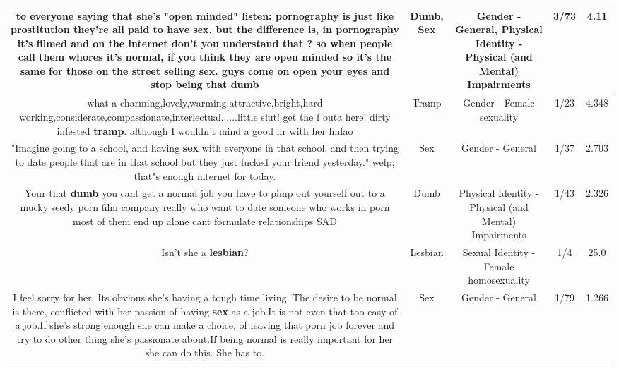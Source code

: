 \documentclass[11pt]{article}
\newlength\mylength
\begin{document}
\begin{center}
\begin{longtable}{|C{.65\mylength}|C{.30\mylength}|C{.12\mylength}|C{.12\mylength}|C{.12\mylength}|}
  \small to everyone saying that she's "open minded" listen: pornography is just like prostitution they're all paid to have \textbf{sex}, but the difference is, in pornography it's filmed and on the internet don't you understand that ? so when people call them whores it's normal, if you think they are open minded so it's the same for those on the street selling \textbf{sex}. guys come on open your eyes and stop being that dumb\normalsize   & Dumb, Sex & Gender - General, Physical Identity - Physical (and Mental) Impairments & 3/73 & 4.11 \\  \hline
  \small what a charming,lovely,warming,attractive,bright,hard working,considerate,compassionate,interlectual......little slut! get the f outa here! dirty infested \textbf{tramp}. although I wouldn't mind a good hr with her lmfao\normalsize   & Tramp & Gender - Female sexuality & 1/23 & 4.348 \\  \hline
  \small "Imagine going to a school, and having \textbf{sex} with everyone in that school, and then trying to date people that are in that school but they just fucked your friend yesterday." welp, that"s enough internet for today.\normalsize   & Sex & Gender - General & 1/37 & 2.703 \\  \hline
  \small Your that \textbf{dumb} you cant get a normal job you have to pimp out yourself out to a mucky seedy porn film company really who want to date someone who works in porn most of them end up alone cant formulate relationships SAD\normalsize   & Dumb & Physical Identity - Physical (and Mental) Impairments & 1/43 & 2.326 \\  \hline
  \small Isn't she a \textbf{lesbian}?\normalsize   & Lesbian & Sexual Identity - Female homosexuality & 1/4 & 25.0 \\  \hline
  \small I feel sorry for her. Its obvious she's having a tough time living. The desire to be normal is there, conflicted with her passion of having \textbf{sex} as a job.It is not even that too easy of a job.If she's strong enough she can make a choice, of leaving that porn job forever and try to do other thing she's passionate about.If being normal is really important for her she can do this. She has to.\normalsize   & Sex & Gender - General & 1/79 & 1.266 \\  \hline

\end{longtable}
\end{center}
\end{document}
